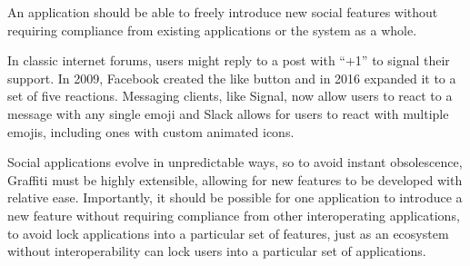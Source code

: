 




\begin{requirement}
\label{requirements:autonomous-extensibility}
    An application should be able to freely introduce new social features without requiring compliance from existing applications or the system as a whole.
\end{requirement}

In classic internet forums, users might reply to a post with ``+1'' to signal their support.
In 2009, Facebook created the like button and in 2016 expanded it to a set of five reactions.
Messaging clients, like Signal, now allow users to react to a message with any single emoji and
Slack allows for users to react with multiple emojis, including ones with custom animated icons.

Social applications evolve in unpredictable ways,
so to avoid instant obsolescence, Graffiti must be highly extensible,
allowing for new features
to be developed with relative ease.
Importantly, it should be possible for one application to introduce a new feature
without requiring compliance from other interoperating applications, to avoid
lock applications into a particular set of features,
just as an ecosystem without interoperability can lock users into a
particular set of applications.

